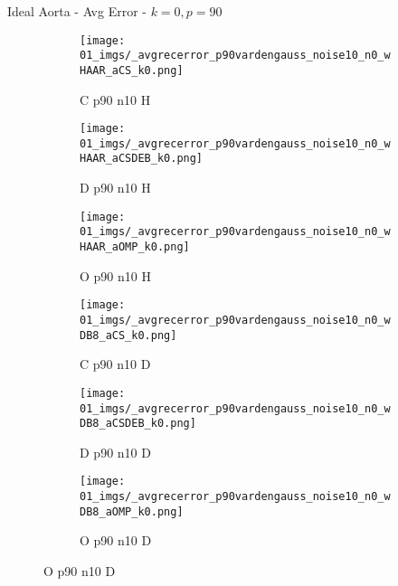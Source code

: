 \begin{frame}{Ideal Aorta - Avg Error - $k=0,p=90$}{}
\begin{figure}
\begin{subfigure}{0.13\textwidth}
\texttt{[image: 01\_imgs/\_avgrecerror\_p90vardengauss\_noise10\_n0\_wHAAR\_aCS\_k0.png]}
\caption*{\tiny C p90 n10 H}
\end{subfigure}
\begin{subfigure}{0.13\textwidth}
\texttt{[image: 01\_imgs/\_avgrecerror\_p90vardengauss\_noise10\_n0\_wHAAR\_aCSDEB\_k0.png]}
\caption*{\tiny D p90 n10 H}
\end{subfigure}
\begin{subfigure}{0.13\textwidth}
\texttt{[image: 01\_imgs/\_avgrecerror\_p90vardengauss\_noise10\_n0\_wHAAR\_aOMP\_k0.png]}
\caption*{\tiny O p90 n10 H}
\end{subfigure}
\begin{subfigure}{0.13\textwidth}
\texttt{[image: 01\_imgs/\_avgrecerror\_p90vardengauss\_noise10\_n0\_wDB8\_aCS\_k0.png]}
\caption*{\tiny C p90 n10 D}
\end{subfigure}
\begin{subfigure}{0.13\textwidth}
\texttt{[image: 01\_imgs/\_avgrecerror\_p90vardengauss\_noise10\_n0\_wDB8\_aCSDEB\_k0.png]}
\caption*{\tiny D p90 n10 D}
\end{subfigure}
\begin{subfigure}{0.13\textwidth}
\texttt{[image: 01\_imgs/\_avgrecerror\_p90vardengauss\_noise10\_n0\_wDB8\_aOMP\_k0.png]}
\caption*{\tiny O p90 n10 D}
\end{subfigure}

\vspace{5pt}


\end{figure}
\end{frame}

